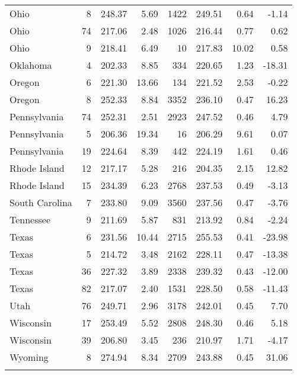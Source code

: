 \begin{longtable}{lrrr@{\extracolsep{10pt}}rrrr}
  Ohio &   8 & 248.37 & 5.69 & 1422 & 249.51 & 0.64 & -1.14 \\ 
  Ohio &  74 & 217.06 & 2.48 & 1026 & 216.44 & 0.77 & 0.62 \\ 
  Ohio &   9 & 218.41 & 6.49 &  10 & 217.83 & 10.02 & 0.58 \\ 
  Oklahoma &   4 & 202.33 & 8.85 & 334 & 220.65 & 1.23 & -18.31 \\ 
  Oregon &   6 & 221.30 & 13.66 & 134 & 221.52 & 2.53 & -0.22 \\ 
  Oregon &   8 & 252.33 & 8.84 & 3352 & 236.10 & 0.47 & 16.23 \\ 
  Pennsylvania &  74 & 252.31 & 2.51 & 2923 & 247.52 & 0.46 & 4.79 \\ 
  Pennsylvania &   5 & 206.36 & 19.34 &  16 & 206.29 & 9.61 & 0.07 \\ 
  Pennsylvania &  19 & 224.64 & 8.39 & 442 & 224.19 & 1.61 & 0.46 \\ 
  Rhode Island &  12 & 217.17 & 5.28 & 216 & 204.35 & 2.15 & 12.82 \\ 
  Rhode Island &  15 & 234.39 & 6.23 & 2768 & 237.53 & 0.49 & -3.13 \\ 
  South Carolina &   7 & 233.80 & 9.09 & 3560 & 237.56 & 0.47 & -3.76 \\ 
  Tennessee &   9 & 211.69 & 5.87 & 831 & 213.92 & 0.84 & -2.24 \\ 
  Texas &   6 & 231.56 & 10.44 & 2715 & 255.53 & 0.41 & -23.98 \\ 
  Texas &   5 & 214.72 & 3.48 & 2162 & 228.11 & 0.47 & -13.38 \\ 
  Texas &  36 & 227.32 & 3.89 & 2338 & 239.32 & 0.43 & -12.00 \\ 
  Texas &  82 & 217.07 & 2.40 & 1531 & 228.50 & 0.58 & -11.43 \\ 
  Utah &  76 & 249.71 & 2.96 & 3178 & 242.01 & 0.45 & 7.70 \\ 
  Wisconsin &  17 & 253.49 & 5.52 & 2808 & 248.30 & 0.46 & 5.18 \\ 
  Wisconsin &  39 & 206.80 & 3.45 & 236 & 210.97 & 1.71 & -4.17 \\ 
  Wyoming &   8 & 274.94 & 8.34 & 2709 & 243.88 & 0.45 & 31.06 \\ 
   \hline
\hline
\label{g4mathtreelevel1}
\end{longtable}
